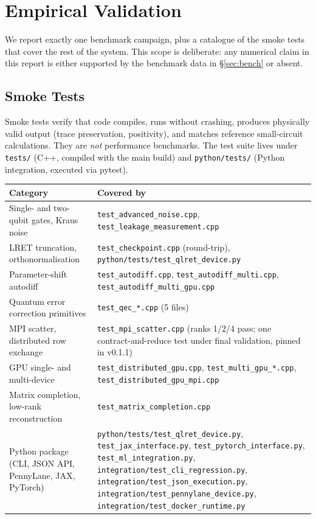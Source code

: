 \documentclass[11pt,a4paper]{article}
\begin{document}
\section{Empirical Validation}
\label{sec:empirical}

We report exactly one benchmark campaign, plus a catalogue of the smoke tests that
cover the rest of the system. This scope is deliberate: any numerical claim in this
report is either supported by the benchmark data in \S\ref{sec:bench} or absent.

\subsection{Smoke Tests}
\label{sec:smoke}

Smoke tests verify that code compiles, runs without crashing, produces physically
valid output (trace preservation, positivity), and matches reference small-circuit
calculations. They are \emph{not} performance benchmarks. The test suite lives under
\texttt{tests/} (C++, compiled with the main build) and \texttt{python/tests/} (Python
integration, executed via pytest).

\begin{center}
\renewcommand{\arraystretch}{1.25}
\begin{tabular}{@{}lp{8.5cm}@{}}
\toprule
\textbf{Category} & \textbf{Covered by} \\
\midrule
Single- and two-qubit gates, Kraus noise &
  \texttt{test\_advanced\_noise.cpp}, \texttt{test\_leakage\_measurement.cpp} \\
LRET truncation, orthonormalisation &
  \texttt{test\_checkpoint.cpp} (round-trip), \texttt{python/tests/test\_qlret\_device.py} \\
Parameter-shift autodiff &
  \texttt{test\_autodiff.cpp}, \texttt{test\_autodiff\_multi.cpp},
  \texttt{test\_autodiff\_multi\_gpu.cpp} \\
Quantum error correction primitives &
  \texttt{test\_qec\_*.cpp} (5 files) \\
MPI scatter, distributed row exchange &
  \texttt{test\_mpi\_scatter.cpp} (ranks 1/2/4 pass; one contract-and-reduce
  test under final validation, pinned in v0.1.1) \\
GPU single- and multi-device &
  \texttt{test\_distributed\_gpu.cpp}, \texttt{test\_multi\_gpu\_*.cpp},
  \texttt{test\_distributed\_gpu\_mpi.cpp} \\
Matrix completion, low-rank reconstruction &
  \texttt{test\_matrix\_completion.cpp} \\
Python package (CLI, JSON API, PennyLane, JAX, PyTorch) &
  \texttt{python/tests/test\_qlret\_device.py}, \texttt{test\_jax\_interface.py},
  \texttt{test\_pytorch\_interface.py}, \texttt{test\_ml\_integration.py},
  \texttt{integration/test\_cli\_regression.py}, \texttt{integration/test\_json\_execution.py},
  \texttt{integration/test\_pennylane\_device.py}, \texttt{integration/test\_docker\_runtime.py} \\
\bottomrule
\end{tabular}
\end{center}
\end{document}

